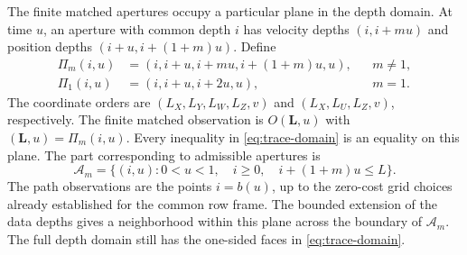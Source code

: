 The finite matched apertures occupy a particular plane in the depth
domain.  At time $u$, an aperture with common depth $i$ has velocity
depths $(i,i+mu)$ and position depths $(i+u,i+(1+m)u)$.  Define
\begin{equation}\label{eq:matched-plane}
 \begin{aligned}
 \Pi_m(i,u)&=(i,i+u,i+mu,i+(1+m)u,u), &&m\ne1,\\
 \Pi_1(i,u)&=(i,i+u,i+2u,u), &&m=1.
 \end{aligned}
\end{equation}
The coordinate orders are $(L_X,L_Y,L_W,L_Z,v)$ and
$(L_X,L_U,L_Z,v)$, respectively.  The finite matched observation is
$O(\mathbf L,u)$ with $(\mathbf L,u)=\Pi_m(i,u)$.
Every inequality in \eqref{eq:trace-domain} is an equality on this
plane.  The part corresponding to admissible apertures is
\begin{equation}\label{eq:matched-aperture-region}
 \mathcal A_m=\{(i,u):0<u<1,\quad i\ge0,\quad i+(1+m)u\le L\}.
\end{equation}
The path observations are the points $i=b(u)$, up to the zero-cost
grid choices already established for the common row frame.
The bounded extension of the data depths gives a neighborhood within
this plane across the boundary of $\mathcal A_m$.  The full depth domain
still has the one-sided faces in \eqref{eq:trace-domain}.

